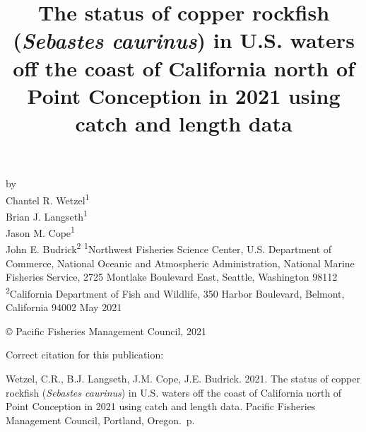 \documentclass[11pt,
  english,
  a4paper,
]{article}
\date{}
\newcommand{\trTitle}{The status of copper rockfish (\emph{Sebastes caurinus}) in U.S. waters off the coast of California north of Point Conception in 2021 using catch and length data}
\newcommand{\trYear}{2021}
\newcommand{\trMonth}{May}
\newcommand{\trAuthsBack}{Wetzel, C.R., B.J. Langseth, J.M. Cope, J.E. Budrick}
\newcommand{\trCitation}{
\begin{hangparas}{1em}{1}
\trAuthsBack{}. \trYear{}. \trTitle{}. Pacific Fisheries Management Council, Portland, Oregon. \pageref{LastPage}{}\,p.
\end{hangparas}}
\begin{document}

\renewcommand*{\thefootnote}{\fnsymbol{footnote}}

\small
\thispagestyle{empty}
\noindent
\begin{center}
\title{The status of copper rockfish (\emph{Sebastes caurinus}) in U.S. waters off the coast of California north of Point Conception in 2021 using catch and length data}
\vspace{1.5cm}
{\Large\textbf{}}
\vfill
by\\
Chantel R. Wetzel\textsuperscript{1}\\
Brian J. Langseth\textsuperscript{1}\\
Jason M. Cope\textsuperscript{1}\\
John E. Budrick\textsuperscript{2}\vfill
\textsuperscript{1}Northwest Fisheries Science Center, U.S. Department of Commerce, National Oceanic and Atmospheric Administration, National Marine Fisheries Service, 2725 Montlake Boulevard East, Seattle, Washington 98112\\
\textsuperscript{2}California Department of Fish and Wildlife, 350 Harbor Boulevard, Belmont, California 94002\vfill
\trMonth{} \trYear{}
\end{center}
\clearpage

\thispagestyle{empty}
\vspace*{\fill}
\begin{center}
\copyright{} Pacific Fisheries Management Council, \trYear{}\\
\end{center}
\par
\bigskip
\noindent
Correct citation for this publication:
\bigskip
\par
\trCitation{}
\clearpage


\tableofcontents\clearpage
\label{TRlastRoman}
\clearpage

\newpage
\thispagestyle{empty} %
\end{document}
